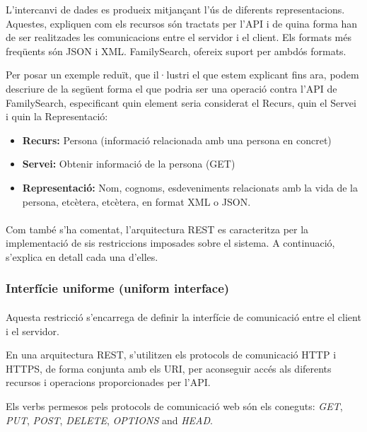     L'intercanvi de dades es produeix mitjançant l'ús de diferents representacions. Aquestes, expliquen com els recursos són tractats per l’\gls{API} i de quina forma han de ser realitzades les comunicacions entre el servidor i el client. Els formats més freqüents són JSON i XML. FamilySearch, ofereix suport per ambdós formats.

    Per posar un exemple reduït, que il·lustri el que estem explicant fins ara, podem descriure de la següent forma el que podria ser una operació contra l'\gls{API} de Family\-Search, especificant quin element seria considerat el Recurs, quin el Servei i quin la Representació:

    \begin{itemize}
        \item \textbf{Recurs:} Persona (informació relacionada amb una persona en concret)
        \item \textbf{Servei:} Obtenir informació de la persona (GET)
        \item \textbf{Representació:} Nom, cognoms, esdeveniments relacionats amb la vida de la persona, etcètera, etcètera, en format \gls{XML} o \gls{JSON}.
    \end{itemize}

    \paragraph{}
    Com també s'ha comentat, l’arquitectura \gls{REST} es caracteritza per la implementació de sis restriccions imposades sobre el sistema. A continuació, s'explica en detall cada una d'elles.


    \subsubsection{Interfície uniforme (uniform interface)}

    \paragraph{}
    Aquesta restricció s'encarrega de definir la interfície de comunicació entre el client i el servidor.

    En una arquitectura REST, s'utilitzen els protocols de comunicació \gls{HTTP} i \gls{HTTPS}, de forma conjunta amb els \gls{URI}, per aconseguir accés als diferents recursos i operacions proporcionades per l'\gls{API}.

    Els verbs permesos pels protocols de comunicació web són els coneguts: \emph{GET}, \emph{PUT}, \emph{POST}, \emph{DELETE}, \emph{OPTIONS} and \emph{HEAD}.

